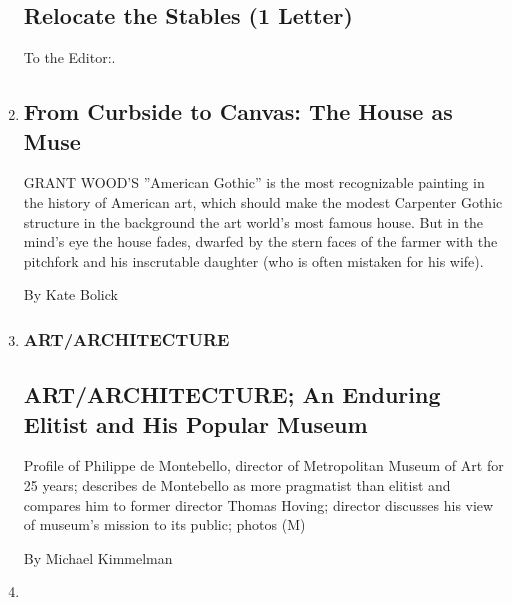 \begin{enumerate}
{  \subsection{Relocate the Stables (1
  Letter)}\label{relocate-the-stables-1-letter}}

  To the Editor:.
\item
  \href{/2005/07/28/garden/from-curbside-to-canvas-the-house-as-muse.html}{}

  \hypertarget{from-curbside-to-canvas-the-house-as-muse}{%
  \subsection{From Curbside to Canvas: The House as
  Muse}\label{from-curbside-to-canvas-the-house-as-muse}}

  GRANT WOOD'S ''American Gothic'' is the most recognizable painting in
  the history of American art, which should make the modest Carpenter
  Gothic structure in the background the art world's most famous house.
  But in the mind's eye the house fades, dwarfed by the stern faces of
  the farmer with the pitchfork and his inscrutable daughter (who is
  often mistaken for his wife).

  By Kate Bolick
\item
  \href{/2002/11/03/arts/art-architecture-an-enduring-elitist-and-his-popular-museum.html}{}

  \hypertarget{artarchitecture}{%
  \subsubsection{ART/ARCHITECTURE}\label{artarchitecture}}

  \hypertarget{artarchitecture-an-enduring-elitist-and-his-popular-museum}{%
  \subsection{ART/ARCHITECTURE; An Enduring Elitist and His Popular
  Museum}\label{artarchitecture-an-enduring-elitist-and-his-popular-museum}}

  Profile of Philippe de Montebello, director of Metropolitan Museum of
  Art for 25 years; describes de Montebello as more pragmatist than
  elitist and compares him to former director Thomas Hoving; director
  discusses his view of museum's mission to its public; photos (M)

  By Michael Kimmelman
\item
  \href{/2001/10/21/nyregion/neighborhood-report-upper-east-side-money-and-an-old-name-slow-met-s-growth-plan.html}{}


\end{enumerate}
